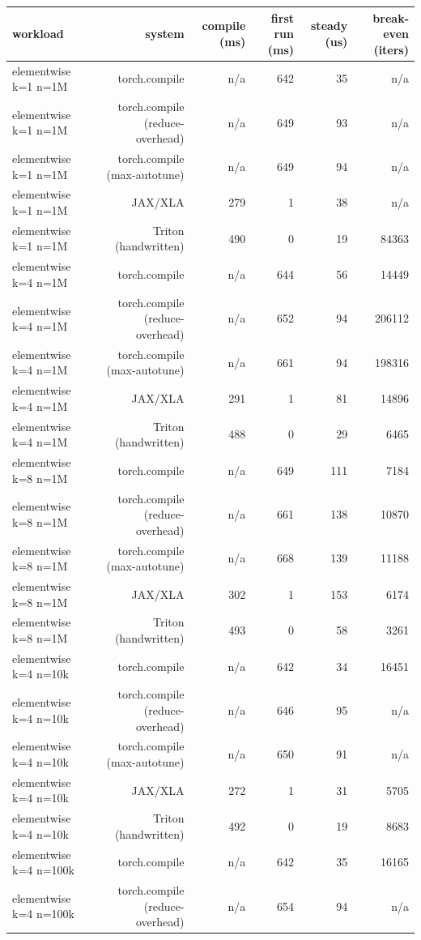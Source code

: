 \begin{tabular}{lrrrrr}
\toprule
workload & system & compile (ms) & first run (ms) & steady (us) & break-even (iters) \\
\midrule
elementwise k=1 n=1M & torch.compile & n/a & 642 & 35 & n/a \\
elementwise k=1 n=1M & torch.compile (reduce-overhead) & n/a & 649 & 93 & n/a \\
elementwise k=1 n=1M & torch.compile (max-autotune) & n/a & 649 & 94 & n/a \\
elementwise k=1 n=1M & JAX/XLA & 279 & 1 & 38 & n/a \\
elementwise k=1 n=1M & Triton (handwritten) & 490 & 0 & 19 & 84363 \\
elementwise k=4 n=1M & torch.compile & n/a & 644 & 56 & 14449 \\
elementwise k=4 n=1M & torch.compile (reduce-overhead) & n/a & 652 & 94 & 206112 \\
elementwise k=4 n=1M & torch.compile (max-autotune) & n/a & 661 & 94 & 198316 \\
elementwise k=4 n=1M & JAX/XLA & 291 & 1 & 81 & 14896 \\
elementwise k=4 n=1M & Triton (handwritten) & 488 & 0 & 29 & 6465 \\
elementwise k=8 n=1M & torch.compile & n/a & 649 & 111 & 7184 \\
elementwise k=8 n=1M & torch.compile (reduce-overhead) & n/a & 661 & 138 & 10870 \\
elementwise k=8 n=1M & torch.compile (max-autotune) & n/a & 668 & 139 & 11188 \\
elementwise k=8 n=1M & JAX/XLA & 302 & 1 & 153 & 6174 \\
elementwise k=8 n=1M & Triton (handwritten) & 493 & 0 & 58 & 3261 \\
elementwise k=4 n=10k & torch.compile & n/a & 642 & 34 & 16451 \\
elementwise k=4 n=10k & torch.compile (reduce-overhead) & n/a & 646 & 95 & n/a \\
elementwise k=4 n=10k & torch.compile (max-autotune) & n/a & 650 & 91 & n/a \\
elementwise k=4 n=10k & JAX/XLA & 272 & 1 & 31 & 5705 \\
elementwise k=4 n=10k & Triton (handwritten) & 492 & 0 & 19 & 8683 \\
elementwise k=4 n=100k & torch.compile & n/a & 642 & 35 & 16165 \\
elementwise k=4 n=100k & torch.compile (reduce-overhead) & n/a & 654 & 94 & n/a \\

\end{tabular}
